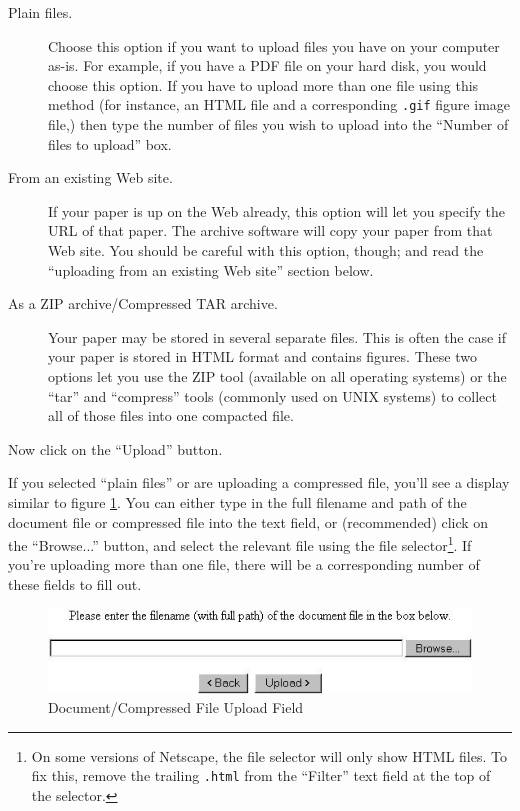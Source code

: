 \begin{description}
\item[Plain files.] Choose this option if you want to upload files you have on your computer as-is. For example, if you have a PDF file on your hard disk, you would choose this option. If you have to upload more than one file using this method (for instance, an HTML file and a corresponding {\tt .gif} figure image file,) then type the number of files you wish to upload into the ``Number of files to upload'' box.
\item[From an existing Web site.] If your paper is up on the Web already, this option will let you specify the URL of that paper. The archive software will copy your paper from that Web site. You should be careful with this option, though; and read the ``uploading from an existing Web site'' section below.
\item[As a ZIP archive/Compressed TAR archive.] Your paper may be stored in several separate files. This is often the case if your paper is stored in HTML format and contains figures. These two options let you use the ZIP tool (available on all operating systems) or the ``tar'' and ``compress'' tools (commonly used on UNIX systems) to collect all of those files into one compacted file.
\end{description}

Now click on the ``Upload'' button.

If you selected ``plain files'' or are uploading a compressed file, you'll see a display similar to figure \ref{plain_files}. You can either type in the full filename and path of the document file or compressed file into the text field, or (recommended) click on the ``Browse...'' button, and select the relevant file using the file selector\footnote{On some versions of Netscape, the file selector will only show HTML files. To fix this, remove the trailing {\tt .html} from the ``Filter'' text field at the top of the selector.}. If you're uploading more than one file, there will be a corresponding number of these fields to fill out.

\begin{figure}
\centerline{\includegraphics[width=4.5in]{images/plain-files}}
\caption{\label{plain_files} Document/Compressed File Upload Field}
\end{figure}

